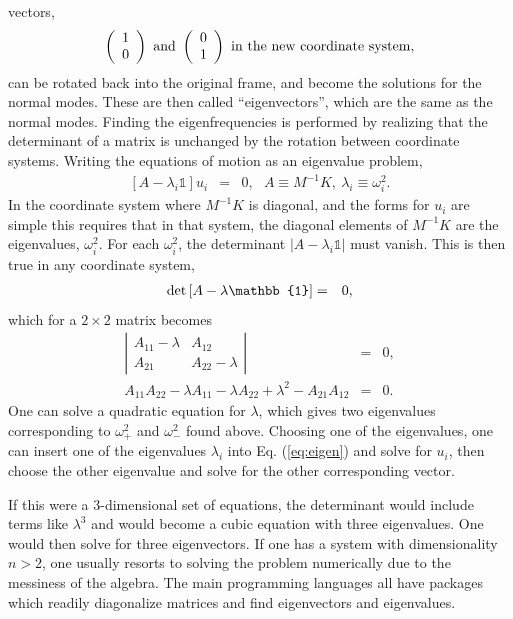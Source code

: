 vectors,
\[
\left(\begin{array}{c} 1\\0\end{array}\right)~{\rm
    and}~\left(\begin{array}{c} 0\\1\end{array}\right)~{\rm
      in~the~new~coordinate~system},
\]
can be rotated back into the original frame, and become the solutions
for the normal modes. These are then called ``eigenvectors'', which
are the same as the normal modes. Finding the eigenfrequencies is
performed by realizing that the determinant of a matrix is unchanged
by the rotation between coordinate systems. Writing the equations of
motion as an eigenvalue problem,
\begin{eqnarray}
\left[A-\lambda_i\mathbb{1}\right]u_i&=&0,~~~A\equiv
M^{-1}K,~\lambda_i\equiv \omega^2_i.
\end{eqnarray}
In the coordinate system where $M^{-1}K$ is diagonal, and the forms
for $u_i$ are simple this requires that in that system, the diagonal
elements of $M^{-1}K$ are the eigenvalues, $\omega_i^2$. For each
$\omega^2_i$, the determinant $|A-\lambda_i\mathbb{1}|$ must
vanish. This is then true in any coordinate system,
\begin{eqnarray}
{\rm det}\left[A-\lambda\mathbb{1}\right]&=&0,
\end{eqnarray}
which for a $2\times 2$ matrix becomes
\begin{eqnarray}
\label{eq:eigen}
\left|
\begin{array}{cc}
A_{11}-\lambda&A_{12}\\ A_{21}&A_{22}-\lambda
\end{array}
\right|&=&0,\\ A_{11}A_{22}-\lambda A_{11}-\lambda
A_{22}+\lambda^2-A_{21}A_{12}&=&0.
\end{eqnarray}
One can solve a quadratic equation for $\lambda$, which gives two
eigenvalues corresponding to $\omega_+^2$ and $\omega_-^2$ found
above. Choosing one of the eigenvalues, one can insert one of the
eigenvalues $\lambda_i$ into Eq. (\ref{eq:eigen}) and solve for $u_i$,
then choose the other eigenvalue and solve for the other corresponding
vector.

If this were a 3-dimensional set of equations, the determinant would
include terms like $\lambda^3$ and would become a cubic equation with
three eigenvalues. One would then solve for three eigenvectors. If one
has a system with dimensionality $n>2$, one usually resorts to solving
the problem numerically due to the messiness of the algebra. The main
programming languages all have packages which readily diagonalize
matrices and find eigenvectors and eigenvalues.
